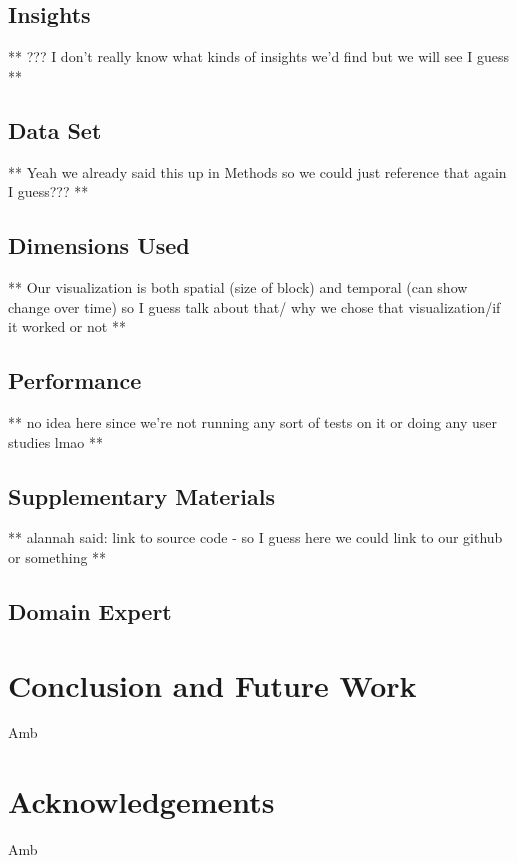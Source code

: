 \documentclass[journal]{vgtc}                %
\begin{document}
\subsection{Insights}

** ??? I don't really know what kinds of insights we'd find but we will see I guess **

\subsection{Data Set}

** Yeah we already said this up in Methods so we could just reference that again I guess??? **

\subsection{Dimensions Used}

** Our visualization is both spatial (size of block) and temporal (can show change over time) so I guess talk about that/
why we chose that visualization/if it worked or not **

\subsection{Performance}

** no idea here since we're not running any sort of tests on it or doing any user studies lmao **

\subsection{Supplementary Materials}
** alannah said: link to source code - so I guess here we could link to our github or something **

\subsection{Domain Expert}

\section{Conclusion and Future Work}

Amb

\section{Acknowledgements}

Amb
\end{document}

